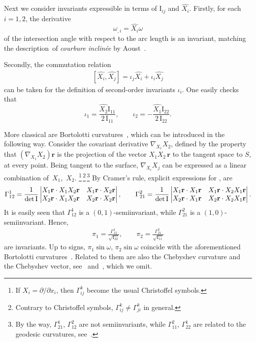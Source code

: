\documentclass[pdftex]{sigma}
\let\ve\mathbf
\def\I#1#2{\mathrm{I}_{#1#2}}
\def\detI{{\rm det\,I}}
\numberwithin{equation}{section}
\begin{document}
Next we consider invariants expressible in terms of
$\I ij$ and $\widehat{X_i}$.
Firstly, for each $i = 1,2$, the derivative
\[
\omega_{,i} = \widehat{X_i} \omega
\]
of the
intersection angle with respect to the arc length is an invariant,
matching the description~of {\it courbure inclin\'ee}
by Aoust~\cite[I, Section~10]{AA}.

Secondly, the commutation relation
\begin{gather}\label{eq:iota}
[\widehat{X_i}, \widehat{X_j}] = \iota_j \widehat{X_i} + \iota_i \widehat{X_j}
\end{gather}
can be taken for the definition of second-order invariants $\iota_i$.
One easily checks that
\[
\iota_1 = \frac{\widehat{X_2} \I11}{2\,\I11}, \qquad
\iota_2 = -\frac{\widehat{X_1} \I22}{2\,\I22}.
\]

More classical are Bortolotti curvatures~\cite[equations~(1) and~(2)]{EB-1925},
which can be introduced in the following way.
Consider the covariant derivative $\nabla_{X_1} X_2$,
defined by the property that
$(\nabla_{X_1} X_2) \ve r$ is the projection
of the vector $X_1 X_2\,\ve r$ to the tangent space to $S$, at every
point.
Being tangent to the surface, $\nabla_{X_i} X_j$ can be expressed as a linear
combination  of~$X_1$,~$X_2$.%
\footnote{If $X_i = \partial/\partial x_i$, then $\Gamma^k_{ij}$
become the usual Christoffel symbols.}\,\footnote{Contrary to Christoffel symbols, $\Gamma^k_{ij} \ne \Gamma^k_{ji}$ in general.}\,\footnote{By the way, $\Gamma^1_{21}$, $\Gamma^2_{12}$ are not semiinvariants,
while
$\Gamma^{2}_{11}$, $\Gamma^{1}_{22}$ are related to the geodesic curvatures,
see~\cite{EB-1925}.}
By Cramer's rule, explicit expressions for , 
are
\begin{gather}
\Gamma^1_{12} = \frac1{\detI}
 \left|\begin{matrix}
  X_1 \ve r \cdot X_1 X_2 \ve r & X_1 \ve r \cdot X_2 \ve r \\
  X_2 \ve r \cdot X_1 X_2 \ve r & X_2 \ve r \cdot X_2 \ve r
 \end{matrix}\right|,
\qquad
\Gamma^2_{21} = \frac1{\detI}
 \left|\begin{matrix}
  X_1 \ve r \cdot X_1 \ve r & X_1 \ve r \cdot X_2 X_1 \ve r \\
  X_2 \ve r \cdot X_1 \ve r & X_2 \ve r \cdot X_2 X_1 \ve r
 \end{matrix}\right|.\label{eq:Gamma}
\end{gather}
It is easily seen that $\Gamma^1_{12}$ is a $(0,1)$-semiinvariant, while
$\Gamma^2_{21}$ is a $(1,0)$-semiinvariant.
Hence,
\begin{gather}\label{eq:pi}
\pi_1 = \frac{\Gamma^1_{12}}{\sqrt{\I 22}}, \qquad
\pi_2 = \frac{\Gamma^2_{21}}{\sqrt{\I 11}}
\end{gather}
are invariants.
Up to signs,
$
\pi_1 \sin\omega$,
$\pi_2 \sin\omega$
coincide with the aforementioned
Bortolotti curvatures~\cite[equations~(1) and~(2)]{EB-1925}.
Related to them are also the Chebyshev curvature and the Chebyshev vector,
see~\cite{KHW-1940} and~\cite[Section~23]{VIS}, which we omit.
\end{document}
